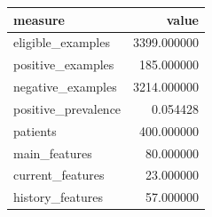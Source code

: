\begin{tabular}{lr}
\toprule
measure & value \\
\midrule
eligible\_examples & 3399.000000 \\
positive\_examples & 185.000000 \\
negative\_examples & 3214.000000 \\
positive\_prevalence & 0.054428 \\
patients & 400.000000 \\
main\_features & 80.000000 \\
current\_features & 23.000000 \\
history\_features & 57.000000 \\
\bottomrule
\end{tabular}
